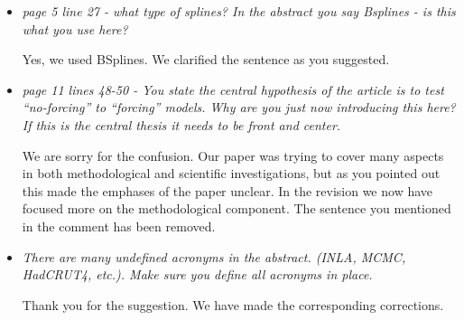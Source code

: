 \documentclass[11pt]{article}
\newcommand{\bl}[1]{\color{red}\textbf{[Bo: #1]}\normalcolor}
\begin{document}
\begin{itemize}
\item \textit{page 5 line 27 - what type of splines? In the abstract you say Bsplines - is this what you use here?}

Yes, we used BSplines. We clarified the sentence as you suggested.

\item \textit{page 11 lines 48-50 - You state the central hypothesis of the
    article is to test “no-forcing” to “forcing” models. Why are you just now
    introducing this here? If this is the central thesis it needs to be front
    and center.}

We are sorry for the confusion. Our paper was trying to cover many aspects in both methodological and scientific investigations, but as you pointed out this made the emphases of the paper unclear. In the revision we now have focused more on the methodological component. The sentence you mentioned in the comment has been removed.  


\item \textit{There are many undefined acronyms in the abstract. (INLA, MCMC,
    HadCRUT4, etc.). Make sure you define all acronyms in place.}

Thank you for the suggestion. We have made the corresponding corrections.


\end{itemize}






\end{document}
